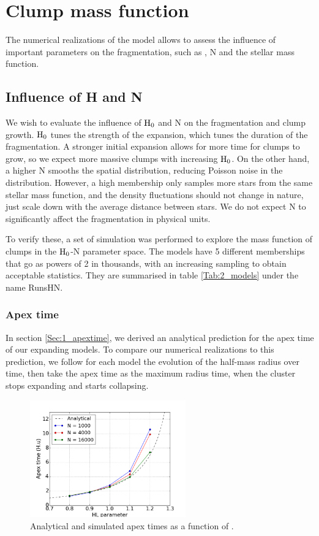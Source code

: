 \section{Clump mass function}

The numerical realizations of the \HubLem model allows to assess the influence of important parameters on the fragmentation, such as \tHub, N and the stellar mass function. 


\subsection{Influence of H and N}

We wish to evaluate the influence of ${\textrm{H}}_0$ and N on the fragmentation and clump growth. ${\textrm{H}}_0$ tunes the strength of the expansion, which tunes the duration of the fragmentation. A stronger initial expansion allows for more time for clumps to grow, so we expect more massive clumps with increasing ${\textrm{H}}_0$. On the other hand, a higher N smooths the spatial distribution, reducing Poisson noise in the  distribution. However, a high membership only samples more stars from the same stellar mass function, and the density fluctuations should not change in nature, just scale down with the average distance between stars.  We do not expect N to significantly affect the fragmentation in physical units. 

To verify these, a set of simulation was performed to explore the mass function of clumps in the ${\textrm{H}}_0$-N parameter space. The models have 5 different memberships that go as powers of 2 in thousands, with an increasing sampling to obtain acceptable statistics. They are summarised in table \ref{Tab:2_models} under the name RunsHN.


\subsubsection*{Apex time}
In section \ref{Sec:1_apextime}, we derived an analytical prediction for the apex time of our expanding models. To compare our numerical realizations to this prediction,  we follow for each model the evolution of the half-mass radius over time, then take the apex time as the maximum radius time, when the cluster stops expanding and starts collapsing. 


\begin{figure}
\begin{center}
\includegraphics[width=0.6\textwidth]{Figures/2_apextime_NH.png}
\end{center}
\caption{Analytical and simulated apex times as a function of \tHub.}
\label{Fig:2_apextime_NH}
\end{figure} 

